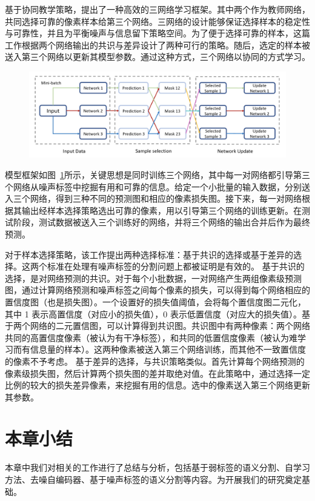 \citet{Zhang2020RobustMI} 基于协同教学策略，提出了一种高效的三网络学习框架。其中两个作为教师网络，共同选择可靠的像素样本给第三个网络。三网络的设计能够保证选择样本的稳定性与可靠性，并且为平衡噪声与信息留下策略空间。为了便于选择可靠的样本，这篇工作根据两个网络输出的共识与差异设计了两种可行的策略。随后，选定的样本被送入第三个网络以更新其模型参数。通过这种方式，三个网络以协同的方式学习。
    \begin{figure}[tbp]
        \centering 
        \includegraphics[width=1.0\textwidth]{img/c2/rel_c3.png}
        \label{c2_fig13}
    \end{figure}
模型框架如图~\ref{c2_fig13}所示，关键思想是同时训练三个网络，其中每一对网络都引导第三个网络从噪声标签中挖掘有用和可靠的信息。给定一个小批量的输入数据，分别送入三个网络，得到三种不同的预测图和相应的像素损失图。接下来，每一对网络根据其输出经样本选择策略选出可靠的像素，用以引导第三个网络的训练更新。在测试阶段，测试数据被送入三个训练好的网络，并将三个网络的输出合并后作为最终预测。

对于样本选择策略，该工作提出两种选择标准：基于共识的选择或基于差异的选择。这两个标准在处理有噪声标签的分割问题上都被证明是有效的。
基于共识的选择，是对网络预测的共识。对于每个小批数据，一对网络产生两组像素级预测图，通过计算网络预测和噪声标签之间每个像素的损失，可以得到每个网络相应的置信度图（也是损失图）。一个设置好的损失值阈值，会将每个置信度图二元化，其中 1 表示高置信度（对应小的损失值），0 表示低置信度（对应大的损失值）。基于两个网络的二元置信图，可以计算得到共识图。共识图中有两种像素：两个网络共同的高置信度像素（被认为有干净标签），和共同的低置信度像素（被认为难学习而有信息量的样本）。这两种像素被送入第三个网络训练，而其他不一致置信度的像素不予考虑。
基于差异的选择，与共识策略类似。首先计算每个网络预测的像素级损失图，然后计算两个损失图的差并取绝对值。在此策略中，通过选择一定比例的较大的损失差异像素，来挖掘有用的信息。选中的像素送入第三个网络更新其参数。


\section{本章小结}
本章中我们对相关的工作进行了总结与分析，包括基于弱标签的语义分割、自学习方法、去噪自编码器、基于噪声标签的语义分割等内容。为开展我们的研究奠定基础。

